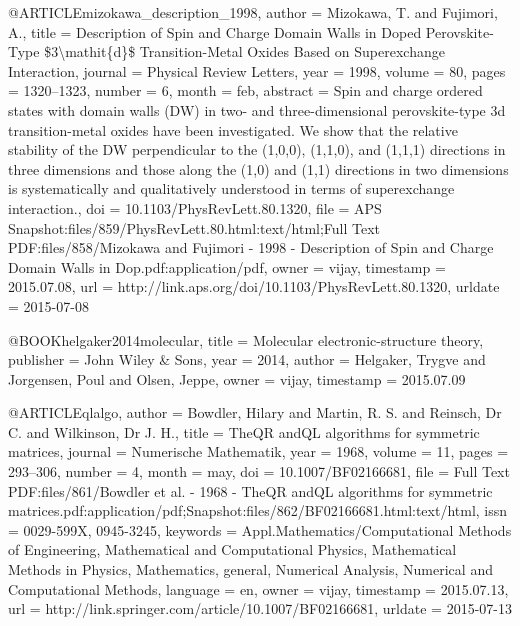 @ARTICLE{mizokawa_description_1998,
  author = {Mizokawa, T. and Fujimori, A.},
  title = {Description of {Spin} and {Charge} {Domain} {Walls} in {Doped} {Perovskite}-{Type}
	\$3{\textbackslash}mathit\{d\}\$ {Transition}-{Metal} {Oxides} {Based}
	on {Superexchange} {Interaction}},
  journal = {Physical Review Letters},
  year = {1998},
  volume = {80},
  pages = {1320--1323},
  number = {6},
  month = feb,
  abstract = {Spin and charge ordered states with domain walls (DW) in two- and
	three-dimensional perovskite-type 3d transition-metal oxides have
	been investigated. We show that the relative stability of the DW
	perpendicular to the (1,0,0), (1,1,0), and (1,1,1) directions in
	three dimensions and those along the (1,0) and (1,1) directions in
	two dimensions is systematically and qualitatively understood in
	terms of superexchange interaction.},
  doi = {10.1103/PhysRevLett.80.1320},
  file = {APS Snapshot:files/859/PhysRevLett.80.html:text/html;Full Text PDF:files/858/Mizokawa and      Fujimori - 1998 - Description of Spin and Charge Domain Walls in Dop.pdf:application/pdf},
  owner = {vijay},
  timestamp = {2015.07.08},
  url = {http://link.aps.org/doi/10.1103/PhysRevLett.80.1320},
  urldate = {2015-07-08}
}


@BOOK{helgaker2014molecular,
  title = {Molecular electronic-structure theory},
  publisher = {John Wiley \& Sons},
  year = {2014},
  author = {Helgaker, Trygve and Jorgensen, Poul and Olsen, Jeppe},
  owner = {vijay},
  timestamp = {2015.07.09}
}

@ARTICLE{qlalgo,
  author = {Bowdler, Hilary and Martin, R. S. and Reinsch, Dr C. and Wilkinson,
	Dr J. H.},
  title = {{TheQR} {andQL} algorithms for symmetric matrices},
  journal = {Numerische Mathematik},
  year = {1968},
  volume = {11},
  pages = {293--306},
  number = {4},
  month = may,
  doi = {10.1007/BF02166681},
  file = {Full Text PDF:files/861/Bowdler et al. - 1968 - TheQR andQL algorithms for symmetric matrices.pdf:application/pdf;Snapshot:files/862/BF02166681.html:text/html},
  issn = {0029-599X, 0945-3245},
  keywords = {Appl.Mathematics/Computational Methods of Engineering, Mathematical
	and Computational Physics, Mathematical Methods in Physics, Mathematics,
	general, Numerical Analysis, Numerical and Computational Methods},
  language = {en},
  owner = {vijay},
  timestamp = {2015.07.13},
  url = {http://link.springer.com/article/10.1007/BF02166681},
  urldate = {2015-07-13}
}

